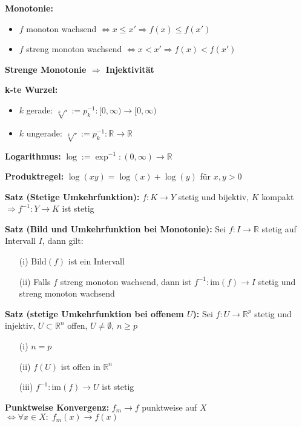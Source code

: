 \begin{itemize}
\textbf{Monotonie:}
\begin{itemize}
  \item \(f\) monoton wachsend \(\Leftrightarrow x \le x' \Rightarrow f(x) \le f(x')\)
  \item \(f\) streng monoton wachsend \(\Leftrightarrow x < x' \Rightarrow f(x) < f(x')\)
\end{itemize}

\textbf{Strenge Monotonie $\Rightarrow$ Injektivität}

\textbf{k-te Wurzel:}
\begin{itemize}
  \item \(k\) gerade: \(\sqrt[k]{\cdot} := p_k^{-1}: [0, \infty) \to [0, \infty)\)
  \item \(k\) ungerade: \(\sqrt[k]{\cdot} := p_k^{-1}: \mathbb{R} \to \mathbb{R}\)
\end{itemize}

\textbf{Logarithmus:}  
\(\log := \exp^{-1} : (0,\infty) \to \mathbb{R}\)

\textbf{Produktregel:}  
\(\log(xy) = \log(x) + \log(y)\) für \(x, y > 0\)

\textbf{Satz (Stetige Umkehrfunktion):}  
\(f: K \to Y\) stetig und bijektiv,\; \(K\) kompakt  
\(\Rightarrow f^{-1}: Y \to K\) ist stetig

\textbf{Satz (Bild und Umkehrfunktion bei Monotonie):}  
Sei \(f: I \to \mathbb{R}\) stetig auf Intervall \(I\), dann gilt:
\begin{itemize}
  \item[(i)] \(\text{Bild}(f)\) ist ein Intervall
  \item[(ii)] Falls \(f\) streng monoton wachsend, dann ist \(f^{-1}: \text{im}(f) \to I\) stetig und streng monoton wachsend
\end{itemize}

\textbf{Satz (stetige Umkehrfunktion bei offenem \(U\)):}  
Sei \(f: U \to \mathbb{R}^p\) stetig und injektiv, \(U \subset \mathbb{R}^n\) offen, \(U \ne \emptyset\), \(n \ge p\)

\begin{itemize}
  \item[(i)] \(n = p\)
  \item[(ii)] \(f(U)\) ist offen in \(\mathbb{R}^n\)
  \item[(iii)] \(f^{-1}: \text{im}(f) \to U\) ist stetig
\end{itemize}


\textbf{Punktweise Konvergenz:}  
\(f_m \to f\) punktweise auf \(X\)  
\(\Leftrightarrow \forall x \in X:\; f_m(x) \to f(x)\)


\end{itemize}
